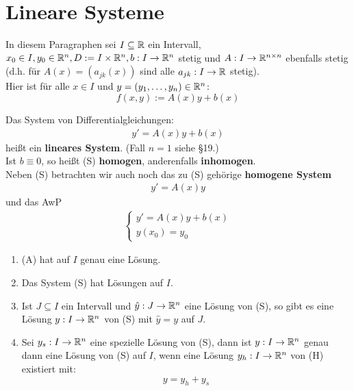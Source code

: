 \documentclass[a4paper,twoside,DIV15,BCOR12mm,chapterprefix=true,headings=twolinechapter]{scrbook}
\begin{document}
\chapter{Lineare Systeme}
In diesem Paragraphen sei $I\subseteq\mathbb{R}$ ein Intervall, $x_0\in I, y_0\in\mathbb{R}^n,
D:=I\times\mathbb{R}^n,b:I\to\mathbb{R}^n$ stetig und $A:I\to\mathbb{R}^{n\times n}$ ebenfalls stetig 
(d.h. für $A(x)=(a_{jk}(x))$ sind alle $a_{jk}:I\to\mathbb{R}$ stetig).\\
Hier ist für alle $x\in I$ und $y=(y_1,\ldots,y_n)\in\mathbb{R}^n$:
\[f(x,y):=A(x)y+b(x)\]

\begin{definition}
Das System von Differentialgleichungen:
\begin{align*}
y'=A(x)y+b(x)\tag{S}
\end{align*}
heißt ein \textbf{lineares System}. (Fall $n=1$ siehe §19.)\\
Ist $b\equiv 0$, so heißt (S) \textbf{homogen}, anderenfalls \textbf{inhomogen}.\\
Neben (S) betrachten wir auch noch das zu (S) gehörige \textbf{homogene System}
\begin{align*}
y'=A(x)y\tag{H}
\end{align*}
und das AwP
\begin{align*}
\tag{A}
\begin{cases}
y'=A(x)y+b(x)\\
y(x_0)=y_0
\end{cases}
\end{align*}
\end{definition}

\begin{satz}
\begin{enumerate}
\item (A) hat auf $I$ genau eine Lösung.
\item Das System (S) hat Lösungen auf $I$.
\item Ist $J\subseteq I$ ein Intervall und $\hat y:J\to\mathbb{R}^n$ eine Lösung von (S),
so gibt es eine Lösung $y:I\to\mathbb{R}^n$ von (S) mit $\hat y=y$ auf $J$.
\item Sei $y_s:I\to\mathbb{R}^n$ eine spezielle Lösung von (S), dann ist $y:I\to\mathbb{R}^n$ genau dann eine
Lösung von (S) auf $I$, wenn eine Lösung $y_h:I\to\mathbb{R}^n$ von (H) existiert mit:
\[y=y_h+y_s\]
\end{enumerate}
\end{satz}
\end{document}
